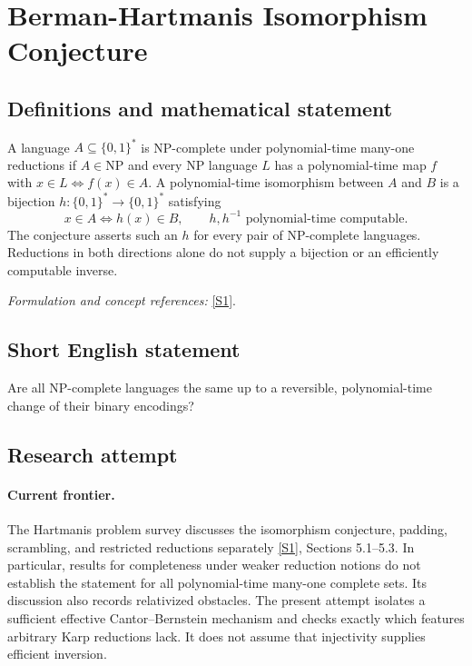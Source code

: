 \documentclass[11pt,a4paper]{article}
\newcommand{\sref}[2]{\hyperlink{source:#1:#2}{[S#2]}}
\newif\ifshowcatalogue
\newcommand{\cataloguescope}[1]{\ifshowcatalogue
 \paragraph{Exact scope in the supplied catalogue.}
 \begin{quote}\small #1\end{quote}\fi}
\numberwithin{equation}{section}
\begin{document}
\setcounter{section}{0}
\clearpage
\section*{\texorpdfstring{Berman-Hartmanis Isomorphism Conjecture}{Berman-Hartmanis Isomorphism Conjecture}}\label{statement}
\subsection{Definitions and mathematical statement}
A language $A\subseteq\{0,1\}^*$ is NP-complete under polynomial-time many-one reductions if $A\in\mathrm{NP}$ and every NP language $L$ has a polynomial-time map $f$ with $x\in L\iff f(x)\in A$. A polynomial-time isomorphism between $A$ and $B$ is a bijection $h:\{0,1\}^*\to\{0,1\}^*$ satisfying
\[
 x\in A\iff h(x)\in B,
 \qquad h,h^{-1}\text{ polynomial-time computable}.
\]
The conjecture asserts such an $h$ for every pair of NP-complete languages. Reductions in both directions alone do not supply a bijection or an efficiently computable inverse.
\par\smallskip\textit{Formulation and concept references:} \sref{statement}{1}.
\cataloguescope{Prove or disprove that for every two languages A and B complete for NP under polynomial-time many-one reductions, there is a bijection h on binary strings such that h(A)=B and both h and its inverse are computable in polynomial time.}
\subsection{Short English statement}
Are all NP-complete languages the same up to a reversible, polynomial-time change of their binary encodings?
\subsection{Research attempt}

\paragraph{Current frontier.}
The Hartmanis problem survey discusses the isomorphism conjecture, padding,
scrambling, and restricted reductions separately \sref{statement}{1},
Sections 5.1--5.3. In particular, results for completeness under weaker
reduction notions do not establish the statement for all polynomial-time
many-one complete sets. Its discussion also records relativized obstacles.
The present attempt isolates a sufficient effective Cantor--Bernstein
mechanism and checks exactly which features arbitrary Karp reductions
lack. It does not assume that injectivity supplies efficient inversion.
\end{document}
